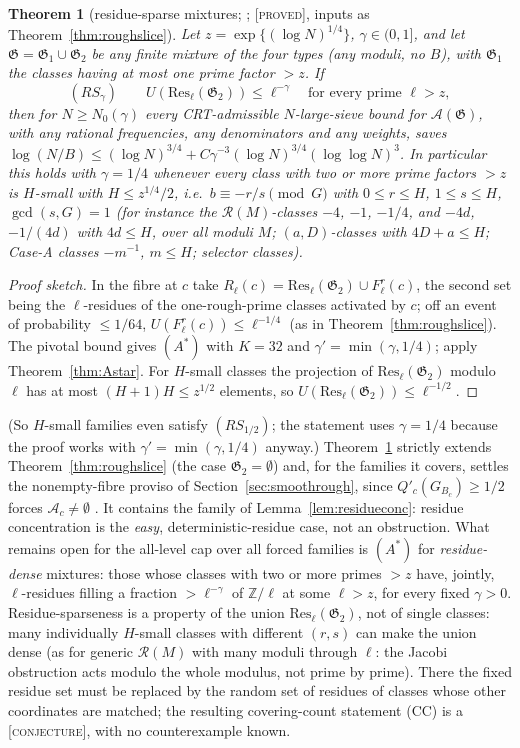 \documentclass[10pt,reqno]{amsart}
\newtheorem{theorem}{Theorem}[section]
\theoremstyle{definition}
\theoremstyle{remark}
\newcommand{\A}{\mathcal A}
\newcommand{\cR}{\mathscr R}
\newcommand{\cG}{\mathfrak G}
\newcommand{\Z}{\mathbb Z}
\newcommand{\lab}[1]{\textup{[\textsc{#1}]}}
\begin{document}
\begin{theorem}[residue-sparse mixtures; {\cite[Thm~5.2, Cor.~5.3]{LS4}}; \lab{proved}, inputs as Theorem~\ref{thm:roughslice}]\label{thm:ressparse}
Let $z=\exp\{(\log N)^{1/4}\}$, $\gamma\in(0,1]$, and let $\cG=\cG_1\cup\cG_2$ be any finite mixture
of the four types (any moduli, no $B$), with $\cG_1$ the classes having at most
one prime factor $>z$.  If
\[
 (RS_\gamma)\qquad U(\mathrm{Res}_\ell(\cG_2))\leq\ell^{-\gamma}\quad\text{for every prime }\ell>z,
\]
then for $N\geq N_0(\gamma)$ every CRT-admissible $N$-large-sieve bound for $\A(\cG)$, with
any rational frequencies, any denominators and any weights, saves
$\log(N/B)\leq(\log N)^{3/4}+C\gamma^{-3}(\log N)^{3/4}(\log\log N)^3$.  In particular this holds
with $\gamma=1/4$ whenever every class with two or more prime factors $>z$ is
$H$-small with $H\leq z^{1/4}/2$, i.e.\ $b\equiv-r/s\pmod G$ with $0\leq r\leq H$, $1\leq s\leq H$,
$\gcd(s,G)=1$ (for instance the $\cR(M)$-classes $-4$, $-1$, $-1/4$, and $-4d$, $-1/(4d)$
with $4d\leq H$, over all moduli $M$; $(a,D)$-classes with $4D+a\leq H$; Case-A classes $-m^{-1}$,
$m\leq H$; selector classes).
\end{theorem}
\begin{proof}[Proof sketch]
In the fibre at $c$ take $R_\ell(c)=\mathrm{Res}_\ell(\cG_2)\cup F^r_\ell(c)$, the second set being the
$\ell$-residues of the one-rough-prime classes activated by $c$; off an event of
probability $\leq1/64$, $U(F^r_\ell(c))\leq\ell^{-1/4}$ (as in Theorem~\ref{thm:roughslice}).  The
pivotal bound gives $(A^*)$ with $K=32$ and $\gamma'=\min(\gamma,1/4)$; apply
Theorem~\ref{thm:Astar}.  For $H$-small classes the projection of $\mathrm{Res}_\ell(\cG_2)$
modulo $\ell$ has at most $(H+1)H\leq z^{1/2}$ elements, so $U(\mathrm{Res}_\ell(\cG_2))\leq\ell^{-1/2}$.
\end{proof}
(So $H$-small families even satisfy $(RS_{1/2})$; the statement uses $\gamma=1/4$
because the proof works with $\gamma'=\min(\gamma,1/4)$ anyway.)
Theorem~\ref{thm:ressparse} strictly extends Theorem~\ref{thm:roughslice} (the case
$\cG_2=\emptyset$) and, for the families it covers, settles the nonempty-fibre
proviso of Section~\ref{sec:smoothrough}, since $Q'_c(G_{B_c})\geq1/2$ forces $\A_c\neq\emptyset$
\cite{LS4rev}.  It contains the family of Lemma~\ref{lem:residueconc}: residue
concentration is the \emph{easy}, deterministic-residue case, not an
obstruction.  What remains open for the all-level cap over all forced
families is $(A^*)$ for \emph{residue-dense} mixtures: those whose classes with
two or more primes $>z$ have, jointly, $\ell$-residues filling a fraction $>\ell^{-\gamma}$
of $\Z/\ell$ at some $\ell>z$, for every fixed $\gamma>0$.  Residue-sparseness is a property
of the union $\mathrm{Res}_\ell(\cG_2)$, not of single classes: many individually $H$-small
classes with different $(r,s)$ can make the union dense (as for generic
$\cR(M)$ with many moduli through $\ell$: the Jacobi obstruction acts modulo the
whole modulus, not prime by prime).  There the fixed residue set must be
replaced by the random set of residues of classes whose other
coordinates are matched; the resulting covering-count statement (CC)
\cite[\S3.2]{LS4} is a \lab{conjecture}, with no counterexample known.
\end{document}
